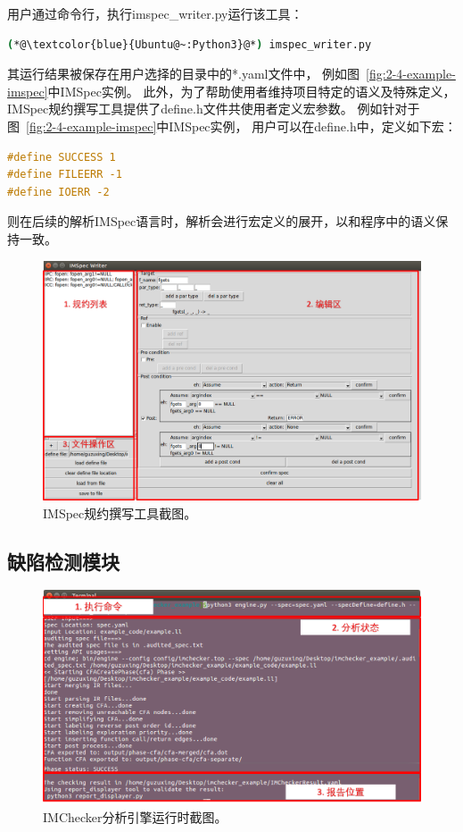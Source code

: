 用户通过命令行，执行imspec\_writer.py运行该工具：
\begin{lstlisting}[language={bash},
basicstyle=\linespread{0.8}\listingsfont,
numbers=none,
xleftmargin=.3\textwidth]
(*@\textcolor{blue}{Ubuntu@~:Python3}@*) imspec_writer.py
\end{lstlisting}
其运行结果被保存在用户选择的目录中的*.yaml文件中，
例如图~\ref{fig:2-4-example-imspec}中IMSpec实例。
此外，为了帮助使用者维持项目特定的语义及特殊定义，
IMSpec规约撰写工具提供了define.h文件共使用者定义宏参数。
例如针对于图~\ref{fig:2-4-example-imspec}中IMSpec实例，
用户可以在define.h中，定义如下宏：
\begin{lstlisting}[language={C},
basicstyle=\linespread{0.8}\listingsfont,
numbers=none,
xleftmargin=.3\textwidth]
#define SUCCESS 1
#define FILEERR -1
#define IOERR -2
\end{lstlisting}
则在后续的解析IMSpec语言时，解析会进行宏定义的展开，以和程序中的语义保持一致。

\begin{figure}[t]
	\centering
	\includegraphics[width=0.85\linewidth]{figures/cp4-IMSpec-writer.png}
	\caption{
		IMSpec规约撰写工具截图。
	}
	\label{fig:4-3-IMSpec-writer}
\end{figure}


\subsection{缺陷检测模块}
\begin{figure}[b]
	\centering
	\includegraphics[width=0.85\linewidth]{figures/cp4-IMChecker-engine.png}
	\caption{
		IMChecker分析引擎运行时截图。
	}
	\label{fig:4-3-IMChecker-engine}
\end{figure}

